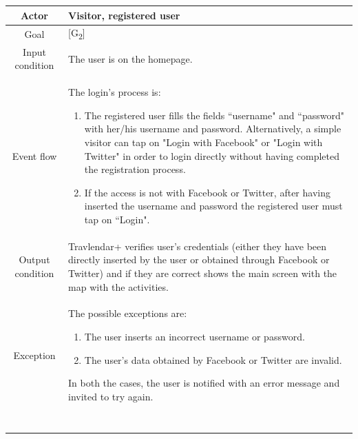 \documentclass[12pt,titlepage]{article}
\begin{document}
\begin{tabular}{cp{10cm}} 
Actor&Visitor, registered user\\ \hline 
Goal& {[G\textsubscript{2}]}\\ \hline
Input condition&The user is on the homepage.\\ \hline
Event flow&The login's process is:\begin{enumerate}
\item The registered user fills the fields ``username" and ``password" with her/his username and password. Alternatively, a simple visitor can tap on "Login with Facebook" or "Login with Twitter" in order to login directly without having completed the registration process.   
\item If the access is not with Facebook or Twitter, after having inserted the username and password the registered user must tap on ``Login".

\end{enumerate} \\ \hline
Output condition& Travlendar+ verifies user's credentials (either they have been directly inserted by the user or obtained through Facebook or Twitter) and if they are correct shows the main screen with the map with the activities.
\\ \hline
Exception& The possible exceptions are:
\begin{enumerate}
\item The user inserts an incorrect username or password.
\item The user's data obtained by Facebook or Twitter are invalid.
\end{enumerate} 
In both the cases, the user is notified with an error message and invited to try again.\\ \hline \

\end{tabular}
\end{document}
